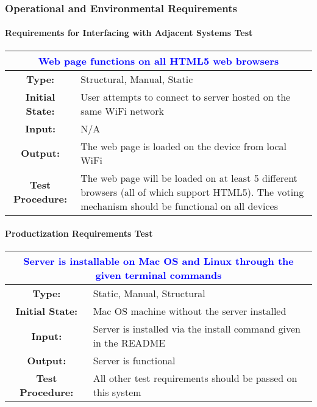 \documentclass[12pt, titlepage]{article}
\begin{document}
\subsubsection{Operational and Environmental Requirements}

\paragraph{Requirements for Interfacing with Adjacent Systems Test}

\begin{center}
\begin{table}[H]
\begin{tabularx}{\textwidth}{| c X |}
\hline
\multicolumn{2}{|c|}{\textbf{\textcolor{blue}{Web page functions on all HTML5 web browsers}}}\\
\hline
\textbf{Type: } & Structural, Manual, Static\\
\textbf{Initial State: } & User attempts to connect to server hosted on the same WiFi network\\
\textbf{Input: } & N/A\\
\textbf{Output: } & The web page is loaded on the device from local WiFi \\
\textbf{Test Procedure:  } & The web page will be loaded on at least 5 different browsers (all of which support HTML5). The voting mechanism should be functional on all devices \\
\hline
\end{tabularx}
\end{table}
\end{center}

\paragraph{Productization Requirements Test}

\begin{center}
\begin{table}[H]
\begin{tabularx}{\textwidth}{| c X |}
\hline
\multicolumn{2}{|c|}{\textbf{\textcolor{blue}{Server is installable on Mac OS and Linux through the given terminal commands}}}\\
\hline
\textbf{Type: } & Static, Manual, Structural\\
\textbf{Initial State: } & Mac OS machine without the server installed\\
\textbf{Input: } & Server is installed via the install command given in the README\\
\textbf{Output: } & Server is functional \\
\textbf{Test Procedure:  } & All other test requirements should be passed on this system \\
\hline
\end{tabularx}
\end{table}
\end{center}
\end{document}
